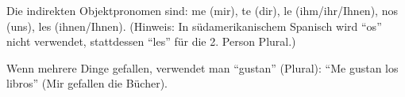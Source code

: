 \documentclass[12pt,a4paper]{article}
\begin{document}
Die indirekten Objektpronomen sind: me (mir), te (dir), le (ihm/ihr/Ihnen), nos (uns), les (ihnen/Ihnen). (Hinweis: In südamerikanischem Spanisch wird \enquote{os} nicht verwendet, stattdessen \enquote{les} für die 2. Person Plural.)

Wenn mehrere Dinge gefallen, verwendet man \enquote{gustan} (Plural): \enquote{Me gustan los libros} (Mir gefallen die Bücher).
\end{document}
